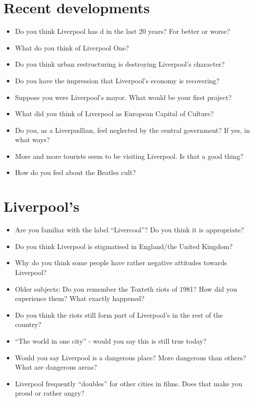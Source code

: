 	\section*{Recent developments}
	\begin{multicols}{2}
		\begin{itemize}
			\item Do you think Liverpool has d in the last 20 years? For better or worse?
			\item What do you think of Liverpool One?
			\item Do you think urban restructuring is destroying Liverpool's character?
			\item Do you have the impression that Liverpool's economy is recovering?
			\item Suppose you were Liverpool's mayor. What would be your first project?
			\item What did you think of Liverpool as European Capital of Culture?
			\item Do you, as a Liverpudlian, feel neglected by the central government? If yes, in what ways?
			\item More and more tourists seem to be visiting Liverpool. Is that a good thing?
			\item How do you feel about the Beatles cult?
		\end{itemize}
	\end{multicols}
	
	\section*{Liverpool's }
	\begin{multicols}{2}
		\begin{itemize}
			\item Are you familiar with the label “Livercool”? Do you think it is appropriate?
			\item Do you think Liverpool is stigmatised in England/the United Kingdom?
			\item Why do you think some people have rather negative attitudes towards Liverpool?
			\item Older subjects: Do you remember the Toxteth riots of 1981? How did you experience them? What exactly happened?
			\item Do you think the riots still form part of Liverpool's  in the rest of the country?
			\item ``The world in one city'' - would you say this is still true today?
			\item Would you say Liverpool is a dangerous place? More dangerous than others? What are dangerous areas?
			\item Liverpool frequently ``doubles'' for other cities in films. Does that make you proud or rather angry?
		\end{itemize}
	\end{multicols}
	
